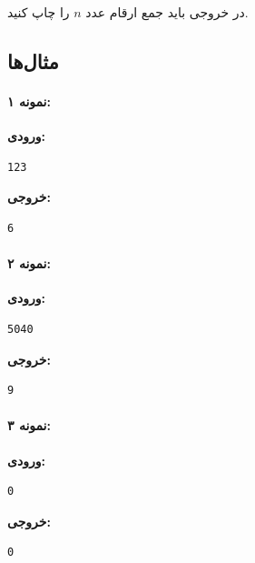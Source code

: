 \documentclass{article}
\begin{document}
در خروجی باید جمع ارقام عدد \( n \) را چاپ کنید.

\subsection{مثال‌ها}

\paragraph{نمونه ۱:}

\textbf{ورودی:}
\begin{LTR}
\begin{verbatim}
123
\end{verbatim}
\end{LTR}

\textbf{خروجی:}
\begin{LTR}
\begin{verbatim}
6
\end{verbatim}
\end{LTR}

\paragraph{نمونه ۲:}

\textbf{ورودی:}
\begin{LTR}
\begin{verbatim}
5040
\end{verbatim}
\end{LTR}

\textbf{خروجی:}
\begin{LTR}
\begin{verbatim}
9
\end{verbatim}
\end{LTR}

\paragraph{نمونه ۳:}

\textbf{ورودی:}
\begin{LTR}
\begin{verbatim}
0
\end{verbatim}
\end{LTR}

\textbf{خروجی:}
\begin{LTR}
\begin{verbatim}
0
\end{verbatim}
\end{LTR}
\end{document}
